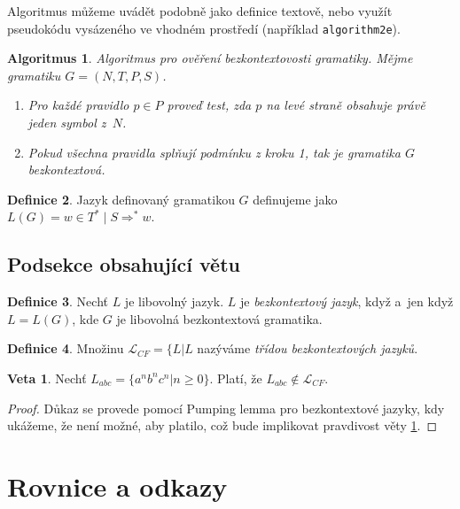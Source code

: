 \documentclass[a4paper,11pt,twocolumn]{article}
\theoremstyle{definition}
\newtheorem{definition}{Definice}[section]
\newtheorem{theorem}{Veta}
\theoremstyle{plain}
\newtheorem{algorithm}[definition]{Algoritmus}
\begin{document}
Algoritmus můžeme uvádět podobně jako definice textově, nebo využít pseudokódu vysázeného ve vhodném prostředí (například \texttt{algorithm2e}).

\begin{algorithm}Algoritmus pro ověření bezkontextovosti gramatiky. Mějme gramatiku $G=(N,T,P,S)$.
\begin{enumerate}
  \item Pro každé pravidlo $p\in P$ proveď test, zda $p$ na levé straně obsahuje právě jeden symbol z~$N$.
  \item Pokud všechna pravidla splňují podmínku z kroku 1, tak je gramatika $G$ bezkontextová.
\end{enumerate}
\end{algorithm}

\begin{definition}Jazyk definovaný gramatikou $G$ definujeme jako $L(G)={w\in T^* \;|\; S\Rightarrow^* w}$.\end{definition}

\subsection{Podsekce obsahující větu}

\begin{definition}Nechť $L$ je libovolný jazyk. $L$ je \emph{bezkontextový jazyk}, když a~jen když $L=L(G)$, kde $G$ je libovolná bezkontextová gramatika.\end{definition}

\begin{definition}Množinu $\mathcal{L}_{CF}= \{L|L$ nazýváme \emph{třídou bezkontextových jazyků}.\end{definition}

\begin{theorem}\label{thrm1}Nechť $L_{abc}=\{a^{n}b^{n}c^{n}|n\ge0\}$. Platí, že $L_{abc} \notin \mathcal{L}_{CF}$.\end{theorem}

\begin{proof}Důkaz se provede pomocí Pumping lemma pro bezkontextové jazyky, kdy ukážeme, že není možné, aby platilo, což bude implikovat pravdivost věty \ref{thrm1}.\end{proof}

\section{Rovnice a odkazy}
\end{document}
